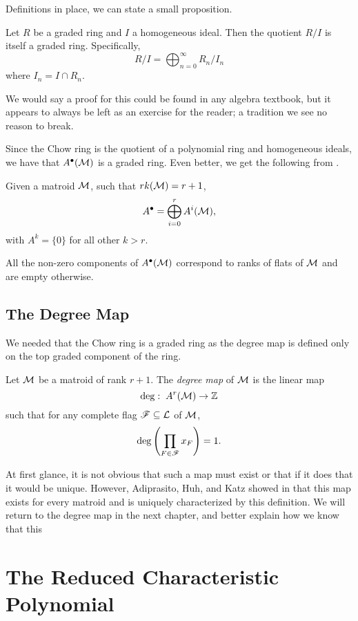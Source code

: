 \documentclass[12pt,oneside]{../../sfsuthesis}
\begin{document}
Definitions in place, we can state a small proposition.
\begin{proposition}
    Let \( R \) be a graded ring and \( I \) a homogeneous ideal.
    Then the quotient \( R/I \) is itself a graded ring.
    Specifically,
    \[
        R/I = \bigoplus_{n=0}^\infty R_n/I_n
    \]
    where \( I_n = I \cap R_n \).
\end{proposition}
We would say a proof for this could be found in any algebra textbook, but it appears to always be left as an exercise for the reader; a tradition we see no reason to break.

Since the Chow ring is the quotient of a polynomial ring and homogeneous ideals, we have that \( A^\bullet(\mathcal{M}) \) is a graded ring.
Even better, we get the following from \cite[Proposition~5.5]{adiprasitoHodgeTheoryCombinatorial2018}.
\begin{proposition}
    Given a matroid \( \mathcal{M} \), such that \( rk(\mathcal{M}) = r + 1 \),
    \[
        A^\bullet = \bigoplus_{i=0}^r A^i(\mathcal{M}),
    \]
    with \( A^k = \{ 0 \} \) for all other \( k > r \).
\end{proposition}
All the non-zero components of \( A^\bullet(\mathcal{M}) \) correspond to ranks of flats of \( \mathcal{M} \) and are empty otherwise.

\subsection{The Degree Map}

We needed that the Chow ring is a graded ring as the degree map is defined only on the top graded component of the ring.
\begin{definition}\label{def:degMap}
    Let \( \mathcal{M} \) be a matroid of rank \( r + 1 \).
    The \emph{degree map} of \( \mathcal{M} \) is the linear map
    \[
        \deg:\; A^r(\mathcal{M}) \to \mathbb{Z}
    \]
    such that for any complete flag \( \mathscr{F} \subseteq \mathcal{L} \) of \( \mathcal{M} \),
    \[
        \deg \left( \prod_{F \in \mathscr{F}}x_F \right) = 1.
    \]
\end{definition}

At first glance, it is not obvious that such a map must exist or that if it does that it would be unique.
However, Adiprasito, Huh, and Katz showed in \cite[Proposition~5.6]{adiprasitoHodgeTheoryCombinatorial2018} that this map exists for every matroid and is uniquely characterized by this definition.
We will return to the degree map in the next chapter, and better explain how we know that this

\section{The Reduced Characteristic Polynomial}
\end{document}
